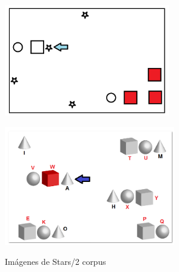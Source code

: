 \begin{figure}[!ht]
\begin{minipage}[b]{0.5\linewidth}
\centering
\includegraphics[width=\textwidth]{images/STARS.png}\\[0pt]
\caption{}
\label{fig-STARS}
\end{minipage}
\hspace*{0cm}
\begin{minipage}[b]{0.5\linewidth}
\centering
\includegraphics[width=\textwidth]{images/STARS2.png}\\[0pt]
\caption{}
\label{fig-STARS2}
\end{minipage}
\caption{Im\'agenes de Stars/2 corpus}
\end{figure}


